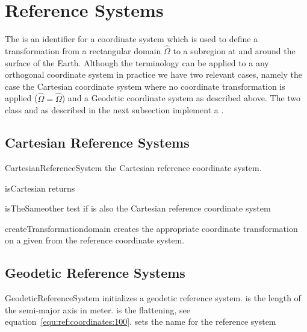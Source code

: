 \section{Reference Systems}\label{sec:ref:reference systems}
The  is an identifier for a coordinate system which is used to define a 
transformation from a rectangular domain $\widehat{\Omega}$ to a subregion at and around the surface of the Earth. 
Although the terminology can be applied to a any orthogonal coordinate system in practice
we have two relevant cases, namely the case the Cartesian coordinate system where no coordinate transformation
is applied ($\widehat{\Omega}= \widehat{\Omega}$) and a Geodetic coordinate system as described above. 
The two class  and  as described in the 
next subsection implement a .

\subsection{Cartesian Reference Systems}
\begin{classdesc}{CartesianReferenceSystem}{}
the Cartesian reference coordinate system.
\end{classdesc}

\begin{methoddesc}[GeodeticReferenceSystem]{isCartesian}{}
returns \True 
\end{methoddesc}


\begin{methoddesc}[CartesianReferenceSystem]{isTheSame}{other}
test if  is also the Cartesian reference coordinate system
\end{methoddesc}


\begin{methoddesc}[CartesianReferenceSystem]{createTransformation}{domain}
creates the appropriate coordinate transformation  on a given 
from the reference coordinate system.
\end{methoddesc}


\subsection{Geodetic Reference Systems}

\begin{classdesc}{GeodeticReferenceSystem}{
}
initializes a geodetic reference system. 
 is the length of the semi-major axis in meter.
 is the flattening, see equation~\ref{equ:ref:coordinates:100}.  
 sets the name for the reference system 
\end{classdesc}


